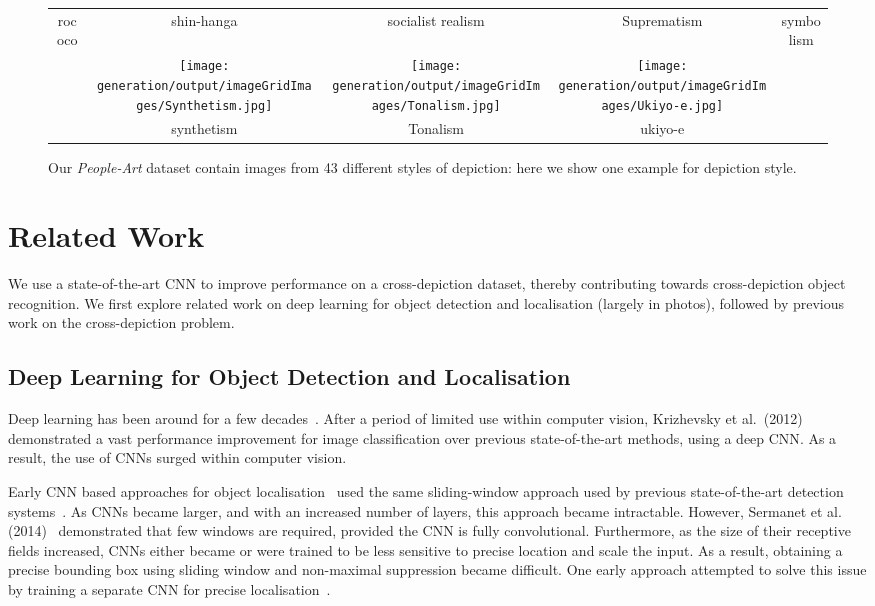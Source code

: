 \documentclass[runningheads]{llncs}
\begin{document}
\begin{figure}[p]
\begin{tabular}{CCCCC}
    \\
    rococo & shin-hanga & socialist realism & Suprematism & symbolism 
    \\[8pt]
    &
    \texttt{[image: generation/output/imageGridImages/Synthetism.jpg]} &
    \texttt{[image: generation/output/imageGridImages/Tonalism.jpg]} &
    \texttt{[image: generation/output/imageGridImages/Ukiyo-e.jpg]} 
    \\
    & synthetism & Tonalism & ukiyo-e  
  \end{tabular}
  \normalsize
  \caption{Our \textit{People-Art} dataset contain  images from 43 different styles of depiction: here we show one example for depiction style.\label{fig:oneImagePerStyle}}
\end{figure}
 
\section{Related Work}
We use a state-of-the-art \ac{CNN} to improve performance on a cross-depiction dataset, thereby contributing towards cross-depiction object recognition.
We first explore related work on deep learning for object detection and localisation (largely in \acp{photo}), followed by previous work on the cross-depiction problem.

\subsection{Deep Learning for Object Detection and Localisation}
Deep learning has been around for a few decades~\cite{fukushima1980neocognitron,giebel1971feature,lecun1989backpropagation}.
After a period of limited use within computer vision, Krizhevsky et al.\ (2012)~\cite{krizhevsky2012imagenet} demonstrated a vast performance improvement for image classification over previous state-of-the-art methods, using a deep \ac{CNN}.
As a result, the use of \acp{CNN} surged within computer vision.

Early \ac{CNN} based approaches for object localisation~\cite{matan1992reading,nowlan1995convolutional,rowley1998neural,sermanet2013pedestrian} used the same sliding-window approach used by previous state-of-the-art detection systems~\cite{dalal2005histograms,felzenszwalb2010object}.
As \acp{CNN} became larger, and with an increased number of layers, this approach became intractable.
However, Sermanet et al. (2014)~\cite{sermanet2014overfeat} demonstrated that few windows are required, provided the \ac{CNN} is fully convolutional.
Furthermore, as the size of their receptive fields increased, \acp{CNN} either became or were trained to be less sensitive to precise location and scale the input.
As a result, obtaining a precise bounding box using sliding window and non-maximal suppression became difficult.
One early approach attempted to solve this issue by training a separate \ac{CNN} for precise localisation~\cite{vaillant1994original}.
\end{document}
